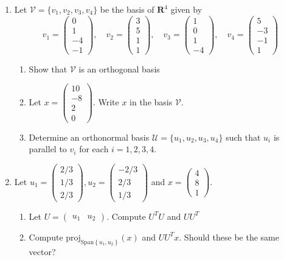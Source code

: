 \documentclass[12pt]{article}
\numberwithin{equation}{subsection}
\numberwithin{figure}{subsection}
\theoremstyle{note}
\newcommand{\R}{\mathbf{R}}
\newcommand\Span[1]{\mathrm{Span}\left\{#1\right\}}
\newcommand\m[1]{\begin{pmatrix}#1\end{pmatrix}}
\newcommand\proj[2]{\mathrm{proj}_{#1}(#2)}
\begin{document}
\begin{enumerate}[label=\arabic*.]
	\item Let $\mathcal{V}=\{v_1,v_2,v_3,v_4\}$ be the basis of $\R^4$ given by \[ v_1=\m{0 \\ 1\\ -4 \\ -1}, \quad v_2=\m{3 \\ 5 \\ 1 \\1}, \quad v_3=\m{1\\0\\1\\-4}, \quad v_4=\m{5 \\ -3 \\ -1 \\1}\]

\begin{enumerate}
	\item Show that $\mathcal{V}$ is an orthogonal basis
	\item Let $x=\m{10 \\ -8 \\ 2 \\ 0}$. Write $x$ in the basis $\mathcal{V}$. 
	\item Determine an orthonormal basis $\mathcal{U}=\{u_1,u_2,u_3,u_4\}$ such that $u_i$ is parallel to $v_i$ for each $i=1,2,3,4$.
\end{enumerate}

\item Let $u_1=\m{2/3 \\ 1/3 \\ 2/3}, u_2=\m{-2/3 \\ 2/3 \\ 1/3}$ and $x=\m{4 \\ 8 \\ 1}$. 
\begin{enumerate}
	\item Let $U=\m{ u_1 & u_2}$. Compute $U^TU$ and $UU^T$
	\item Compute $\proj{\Span{u_1,u_2}}{x}$ and $UU^Tx$. Should these be the same vector? 
\end{enumerate}
	

\end{enumerate}
\end{document}
